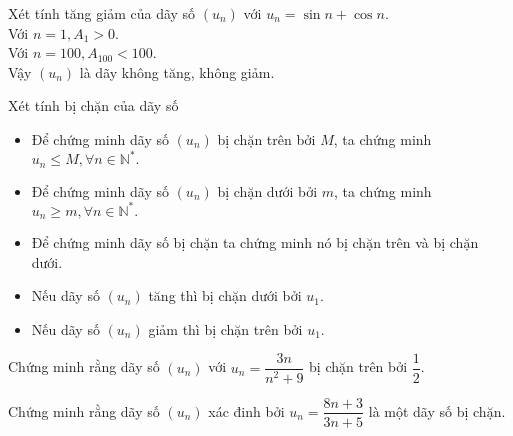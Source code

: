 \begin{bt}%
	Xét tính tăng giảm của dãy số $(u_n)$ với $u_n=\sin{n}+\cos{n}$.
	\\
	Với $n=1, A_1>0$.\\
	Với $n=100, A_{100}<100$.\\
	Vậy $(u_n)$ là dãy không tăng, không giảm.
\end{bt}

\begin{dang}{Xét tính bị chặn của dãy số}
	\begin{itemize}
		\item Để chứng minh dãy số $(u_n)$ bị chặn trên bởi $M$, ta chứng minh $u_n\leq M, \forall n\in \mathbb{N}^*.$
		\item Để chứng minh dãy số $(u_n)$ bị chặn dưới bởi $m$, ta chứng minh $u_n\geq m, \forall n\in \mathbb{N}^*.$
		\item Để chứng minh dãy số bị chặn ta chứng minh nó bị chặn trên và bị chặn dưới.
		\item Nếu dãy số $(u_n)$ tăng thì bị chặn dưới bởi $u_1$.
		\item Nếu dãy số $(u_n)$ giảm thì bị chặn trên bởi $u_1$.
	\end{itemize}
\end{dang}
\setcounter{vd}{0}
\setcounter{bt}{0}

\begin{vd}%
	Chứng minh rằng dãy số $(u_n)$ với $u_n=\dfrac{3n}{n^2+9}$ bị chặn trên bởi $\dfrac{1}{2}$.
\end{vd}

\begin{vd}%
	Chứng minh rằng dãy số $(u_n)$ xác đinh bởi $u_n=\dfrac{8n+3}{3n+5}$ là một dãy số bị chặn.
\end{vd}

